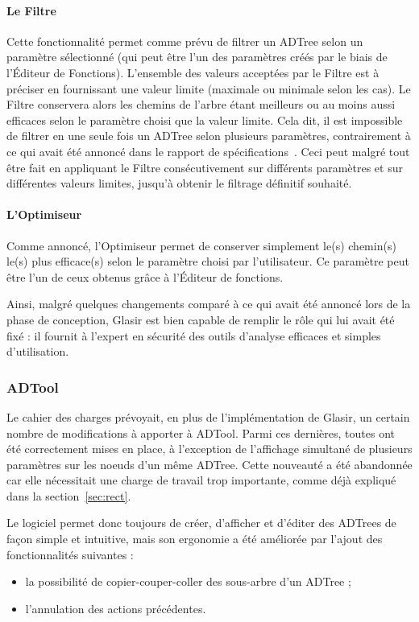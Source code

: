 \paragraph{Le Filtre} Cette fonctionnalité permet comme prévu de filtrer un ADTree selon un paramètre sélectionné (qui peut être l'un des paramètres créés par le biais de l'Éditeur de Fonctions). L'ensemble des valeurs acceptées par le Filtre est à préciser en fournissant une valeur limite (maximale ou minimale selon les cas). Le Filtre conservera alors les chemins de l'arbre étant meilleurs ou au moins aussi efficaces selon le paramètre choisi que la valeur limite. Cela dit, il est impossible de filtrer en une seule fois un ADTree selon plusieurs paramètres, contrairement à ce qui avait été annoncé dans le rapport de spécifications~\cite{spec_fonc}. Ceci peut malgré tout être fait en appliquant le Filtre consécutivement sur différents paramètres et sur différentes valeurs limites, jusqu'à obtenir le filtrage définitif souhaité.

\paragraph{L'Optimiseur} Comme annoncé, l'Optimiseur permet de conserver simplement le(s) chemin(s) le(s) plus efficace(s) selon le paramètre choisi par l'utilisateur. Ce paramètre peut être l'un de ceux obtenus grâce à l'Éditeur de fonctions.

Ainsi, malgré quelques changements comparé à ce qui avait été annoncé lors de la phase de conception, Glasir est bien capable de remplir le rôle qui lui avait été fixé :  il fournit à l'expert en sécurité des outils d'analyse efficaces et simples d'utilisation.

\subsubsection{ADTool}
\label{sssec:obj_adtool}

Le cahier des charges prévoyait, en plus de l'implémentation de Glasir, un certain nombre de modifications à apporter à ADTool. Parmi ces dernières, toutes ont été correctement mises en place, à l'exception de l'affichage simultané de plusieurs paramètres sur les noeuds d'un même ADTree. Cette nouveauté a été abandonnée car elle nécessitait une charge de travail trop importante, comme déjà expliqué dans la {\sc section}~\ref{sec:rect}.

Le logiciel permet donc toujours de créer, d'afficher et d'éditer des ADTrees de façon simple et intuitive, mais son ergonomie a été améliorée par l'ajout des fonctionnalités suivantes :
\begin{itemize}
    \item la possibilité de copier-couper-coller des sous-arbre d'un ADTree ;
    \item l'annulation des actions précédentes.
\end{itemize}

